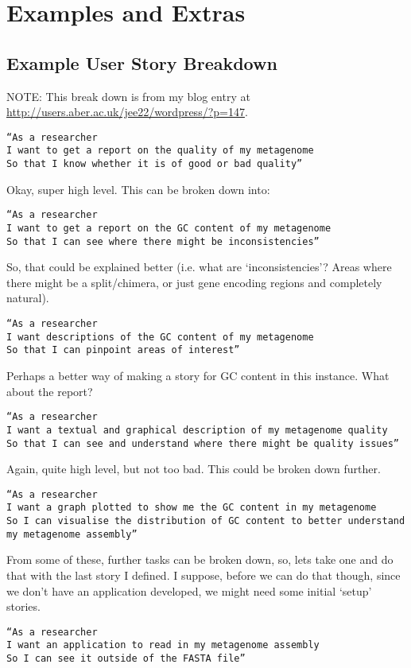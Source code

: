 \chapter{Examples and Extras}

\section{Example User Story Breakdown}
NOTE: This break down is from my blog entry at \url{http://users.aber.ac.uk/jee22/wordpress/?p=147}.
\begin{verbatim}
“As a researcher
I want to get a report on the quality of my metagenome
So that I know whether it is of good or bad quality”
\end{verbatim}
Okay, super high level. This can be broken down into:
\begin{verbatim}
“As a researcher
I want to get a report on the GC content of my metagenome
So that I can see where there might be inconsistencies”
\end{verbatim}
So, that could be explained better (i.e. what are ‘inconsistencies’? Areas where there might be a split/chimera, or just gene encoding regions and completely natural).
\begin{verbatim}
“As a researcher
I want descriptions of the GC content of my metagenome
So that I can pinpoint areas of interest”
\end{verbatim}
Perhaps a better way of making a story for GC content in this instance.
What about the report?
\begin{verbatim}
“As a researcher
I want a textual and graphical description of my metagenome quality
So that I can see and understand where there might be quality issues”
\end{verbatim}
Again, quite high level, but not too bad. This could be broken down further.
\begin{verbatim}
“As a researcher
I want a graph plotted to show me the GC content in my metagenome
So I can visualise the distribution of GC content to better understand my metagenome assembly”
\end{verbatim}
From some of these, further tasks can be broken down, so, lets take one and do that with the last story I defined. I suppose, before we can do that though, since we don’t have an application developed, we might need some initial ‘setup’ stories.
\begin{verbatim}
“As a researcher
I want an application to read in my metagenome assembly
So I can see it outside of the FASTA file”
\end{verbatim}
